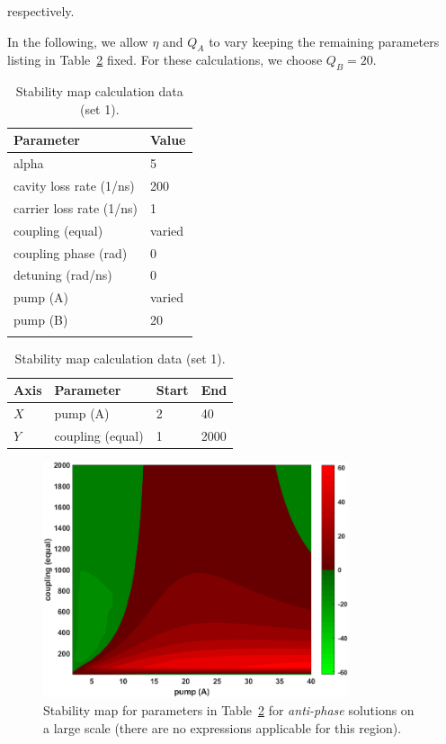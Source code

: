 \documentclass[a4paper,12pt]{article}
\begin{document}
\noindent respectively.

In the following, we allow $\eta$ and $Q_{A}$ to vary keeping the remaining parameters listing in Table~\ref{table1} fixed. For these calculations, we choose $Q_{B} = 20$.


\begin{table}[h!]
\centering 
\begin{tabular}{ll}
Parameter & Value \\
\hline
alpha  &  5 \\
cavity loss rate (1/ns) &  200 \\
carrier loss rate (1/ns) & 1 \\
coupling (equal) & varied \\
coupling phase (rad) & 0 \\
detuning (rad/ns) & 0 \\
pump (A) & varied \\
pump (B) & 20 \\
\hline \\
\end{tabular}

\begin{tabular}{llll}
Axis & Parameter & Start & End \\
\hline
$X$ & pump (A) & 2 & 40  \\ 
$Y$ & coupling (equal) & 1 & 2000  \\ 
\hline
\end{tabular}

\caption{Stability map calculation data (set 1).}\label{table1}

\end{table}

\begin{figure}[h!]
\centering 
\includegraphics[width=0.8\textwidth]{Eq_10_antiphase_large_QB_20.png}
\caption{Stability map for parameters in Table~\ref{table1} for \emph{anti-phase} solutions on a large scale (there are no expressions applicable for this region).}
\end{figure}
\end{document}
